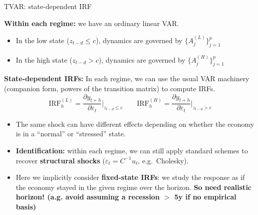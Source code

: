 \documentclass{beamer}
\begin{document}
\begin{frame}{TVAR: state-dependent IRF}
\small

\textbf{Within each regime:} we have an ordinary linear VAR.

\begin{itemize}
  \item In the low state ($z_{t-d} \le c$), dynamics are governed by
        $\{A_j^{(L)}\}_{j=1}^p$
  \item In the high state ($z_{t-d} > c$), dynamics are governed by
        $\{A_j^{(H)}\}_{j=1}^p$
\end{itemize}

\textbf{State-dependent IRFs:} In each regime, we can use the usual VAR machinery
        (companion form, powers of the transition matrix) to compute IRFs.
\[
\text{IRF}_h^{(L)} =
\frac{\partial y_{t+h}}{\partial \varepsilon_t} \Big|_{z_{t-d} \le c}
\qquad
\text{IRF}_h^{(H)} =
\frac{\partial y_{t+h}}{\partial \varepsilon_t} \Big|_{z_{t-d} > c}
\]

\begin{itemize}
  \item The same shock can have different effects
        depending on whether the economy is in a “normal” or “stressed” state.
  \item \textbf{Identification:} within each regime, we can still apply
        standard schemes to recover \textbf{structural shocks} ($\varepsilon_t = C^{-1}u_t$, e.g.\ Cholesky).
  \item Here we implicitly consider \textbf{fixed-state IRFs}: we study the response as if the economy stayed in the given regime over the horizon.\textbf{ So need realistic horizon! (a.g. avoid assuming a recession $>$ 5y if no empirical basis)}
\end{itemize}

\end{frame}
\end{document}
